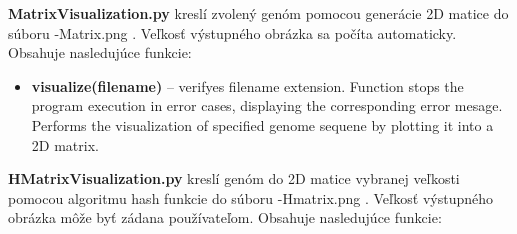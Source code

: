 \textbf{\selectfont MatrixVisualization.py} kreslí zvolený genóm pomocou generácie 2D matice do súboru {\selectfont -Matrix.png} .
Veľkosť výstupného obrázka sa počíta automaticky.
Obsahuje nasledujúce funkcie:
\begin{itemize}
  \item \textbf{\selectfont visualize(filename)} -- verifyes {\selectfont filename} extension. Function stops the program execution in error cases, displaying the corresponding error mesage. Performs the visualization of specified genome sequene by plotting it into a 2D matrix.
\end{itemize}



\textbf{\selectfont HMatrixVisualization.py} kreslí genóm do 2D matice vybranej veľkosti pomocou algoritmu hash funkcie do súboru {\selectfont -Hmatrix.png} .
Veľkosť výstupného obrázka môže byť zádana používateľom.
Obsahuje nasledujúce funkcie:

